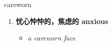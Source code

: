 
\begin{frame}
{\huge careworn}
\begin{center}
\begin{enumerate}\Large
  \item \textbf{忧心忡忡的，焦虑的 anxious}
  \begin{itemize}
    \item \em{\Large{a careworn face}}
  \end{itemize}
\end{enumerate}
\end{center}
\end{frame}

